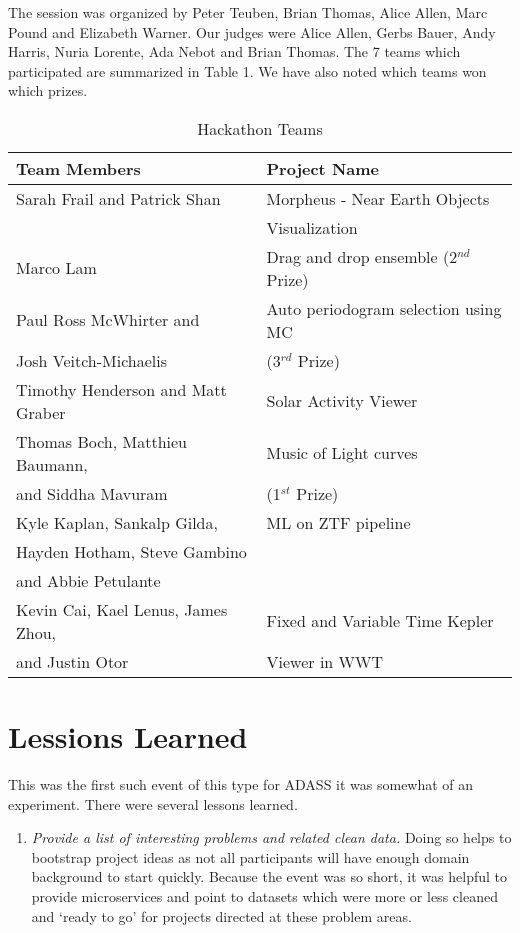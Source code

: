 \documentclass[11pt,twoside]{article}
\begin{document}
{The session was organized by Peter Teuben, Brian Thomas, Alice Allen, Marc Pound and Elizabeth Warner. Our judges were Alice Allen, Gerbs Bauer, Andy Harris, Nuria Lorente, Ada Nebot and Brian Thomas. The 7 teams which participated are summarized in Table 1. We have also noted which teams won which prizes.

\begin{table}
\caption{Hackathon Teams} \label{tab:title} 
\begin{center}
\begin{tabular}{|l|l|} \hline 
{\bf Team Members} & {\bf Project Name } \\ \hline\hline 
Sarah Frail and Patrick Shan & Morpheus - Near Earth Objects \\ \hline 
 & Visualization \\ \hline
	Marco Lam &  Drag and drop ensemble (2$^{nd}$ Prize) \\ \hline 
Paul Ross McWhirter and & Auto periodogram selection using MC \\ 
	Josh Veitch-Michaelis &  (3$^{rd}$ Prize) \\ \hline 
Timothy Henderson and Matt Graber &  Solar Activity Viewer \\ \hline 
Thomas Boch, Matthieu Baumann, & Music of Light curves \\
	and Siddha Mavuram & (1$^{st}$ Prize) \\ \hline
Kyle Kaplan, Sankalp Gilda, & ML on ZTF pipeline \\ 
Hayden Hotham, Steve Gambino & \\ 
and Abbie Petulante & \\ \hline 
Kevin Cai, Kael Lenus, James Zhou, & Fixed and Variable Time Kepler \\ 
and Justin Otor &  Viewer in WWT \\ \hline\hline 
\end{tabular}
\end{center}
\end{table}

\section*{Lessions Learned}


This was the first such event of this type for ADASS it was somewhat of an experiment. There were several lessons learned.

\begin{enumerate}

	\item \textit{Provide a list of interesting problems and related clean data.} Doing so helps to bootstrap project ideas as not all participants will have enough domain background to start quickly. Because the event was so short, it was helpful to provide microservices and point to datasets which were more or less cleaned and ‘ready to go’ for projects directed at these problem areas.


\end{enumerate}}
\end{document}
